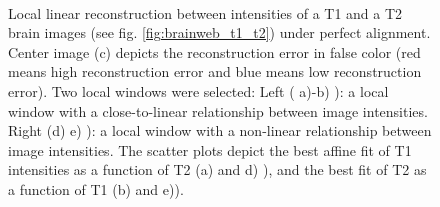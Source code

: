 \begin{figure}[t!]
\centering
    \\
    \caption{Local linear reconstruction between intensities of a T1 and a T2 brain images (see fig. \ref{fig:brainweb_t1_t2}) under perfect alignment. Center image (c) depicts the reconstruction error in false color (red means high reconstruction error and blue means low reconstruction error). Two local windows were selected: Left ( a)-b) ): a local window with a close-to-linear relationship between image intensities. Right (d) e) ): a local window with a non-linear relationship between image intensities. The scatter plots depict the best affine fit of T1 intensities as a function of T2 (a) and d) ), and the best fit of T2 as a function of T1 (b) and e)).}
\label{fig:llr_test}
\end{figure}





